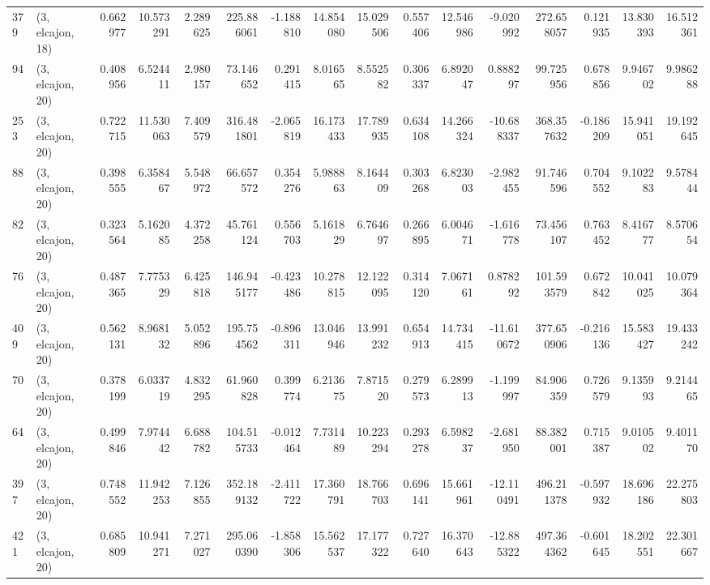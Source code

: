 \begin{tabular}{llrrrrrrrrrrrrrr}
379 &  (3, elcajon, 18) &   0.662977 &  10.573291 &   2.289625 &   225.886061 &  -1.188810 &  14.854080 &  15.029506 &  0.557406 &  12.546986 &  -9.020992 &   272.658057 &  0.121935 &  13.830393 &  16.512361 \\
94  &  (3, elcajon, 20) &   0.408956 &   6.524411 &   2.980157 &    73.146652 &   0.291415 &   8.016565 &   8.552582 &  0.306337 &   6.892047 &   0.888297 &    99.725956 &  0.678856 &   9.946702 &   9.986288 \\
253 &  (3, elcajon, 20) &   0.722715 &  11.530063 &   7.409579 &   316.481801 &  -2.065819 &  16.173433 &  17.789935 &  0.634108 &  14.266324 & -10.688337 &   368.357632 & -0.186209 &  15.941051 &  19.192645 \\
88  &  (3, elcajon, 20) &   0.398555 &   6.358467 &   5.548972 &    66.657572 &   0.354276 &   5.988863 &   8.164409 &  0.303268 &   6.823003 &  -2.982455 &    91.746596 &  0.704552 &   9.102283 &   9.578444 \\
82  &  (3, elcajon, 20) &   0.323564 &   5.162085 &   4.372258 &    45.761124 &   0.556703 &   5.161829 &   6.764697 &  0.266895 &   6.004671 &  -1.616778 &    73.456107 &  0.763452 &   8.416777 &   8.570654 \\
76  &  (3, elcajon, 20) &   0.487365 &   7.775329 &   6.425818 &   146.945177 &  -0.423486 &  10.278815 &  12.122095 &  0.314120 &   7.067161 &   0.878292 &   101.593579 &  0.672842 &  10.041025 &  10.079364 \\
409 &  (3, elcajon, 20) &   0.562131 &   8.968132 &   5.052896 &   195.754562 &  -0.896311 &  13.046946 &  13.991232 &  0.654913 &  14.734415 & -11.610672 &   377.650906 & -0.216136 &  15.583427 &  19.433242 \\
70  &  (3, elcajon, 20) &   0.378199 &   6.033719 &   4.832295 &    61.960828 &   0.399774 &   6.213675 &   7.871520 &  0.279573 &   6.289913 &  -1.199997 &    84.906359 &  0.726579 &   9.135993 &   9.214465 \\
64  &  (3, elcajon, 20) &   0.499846 &   7.974442 &   6.688782 &   104.515733 &  -0.012464 &   7.731489 &  10.223294 &  0.293278 &   6.598237 &  -2.681950 &    88.382001 &  0.715387 &   9.010502 &   9.401170 \\
397 &  (3, elcajon, 20) &   0.748552 &  11.942253 &   7.126855 &   352.189132 &  -2.411722 &  17.360791 &  18.766703 &  0.696141 &  15.661961 & -12.110491 &   496.211378 & -0.597932 &  18.696186 &  22.275803 \\
421 &  (3, elcajon, 20) &   0.685809 &  10.941271 &   7.271027 &   295.060390 &  -1.858306 &  15.562537 &  17.177322 &  0.727640 &  16.370643 & -12.885322 &   497.364362 & -0.601645 &  18.202551 &  22.301667 \\

\end{tabular}
